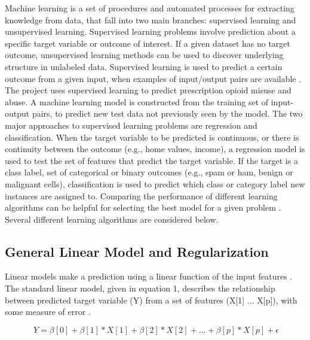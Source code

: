 \documentclass[sigconf]{acmart}
\begin{document}
Machine learning is a set of procedures and automated processes for extracting 
knowledge from data, that fall into two main branches: supervised learning and 
unsupervised learning. Supervised learning problems involve prediction about a 
specific target variable or outcome of interest. If a given dataset has no 
target outcome, unsupervised learning methods can be used to discover underlying 
structure in unlabeled data. Supervised learning is used to predict a certain 
outcome from a given input, when examples of input/output pairs are available 
\cite{muller17}. The project uses supervised learning to predict prescription 
opioid misuse and abuse. A machine learning model is constructed from the 
training set of input-output pairs, to predict new test data not previously 
seen by the model. The two major approaches to supervised learning problems are 
regression and classification. When the target variable to be predicted is 
continuous, or there is continuity between the outcome (e.g., home values, 
income), a regression model is used to test the set of features that predict 
the target variable. If the target is a class label, set of categorical or 
binary outcomes (e.g., spam or ham, benign or malignant cells), classification 
is used to predict which class or category label new instances are assigned to.
Comparing the performance of different learning algorithms can be helpful for 
selecting the best model for a given problem \cite{raschka17}. Several different 
learning algorithms are considered below.

\subsection{General Linear Model and Regularization} 

Linear models make a prediction using a linear function of the input features
\cite{muller17}. The standard linear model, given in equation 1, describes the
relationship between predicted target variable (Y) from a set of features 
(X[1] ... X[p]), with some measure of error . 

\begin{equation}
  \ Y = \beta[0] + \beta[1]*X[1] + \beta[2]*X[2] +... + \beta[p]*X[p] + \epsilon
\end{equation}
\end{document}
